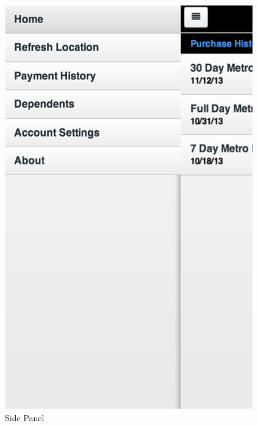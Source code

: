 \begin{figure}
\centering
	\includegraphics[scale=1]{Prototype/side-panel.png}
\caption{Side Panel}
\end{figure}